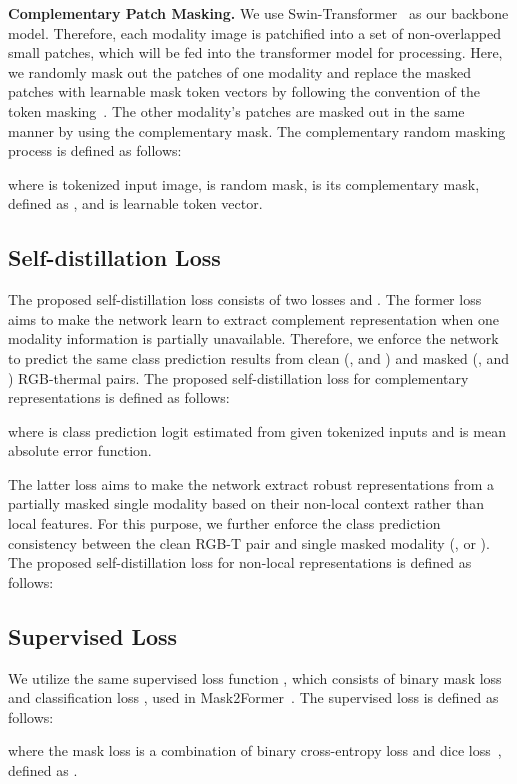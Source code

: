 \documentclass[10pt,twocolumn,letterpaper]{article}
\begin{document}
\textbf{Complementary Patch Masking.} We use Swin-Transformer~\cite{liu2021swin} as our backbone model.
Therefore, each modality image is patchified into a set of non-overlapped small patches, which will be fed into the transformer model for processing.
Here, we randomly mask out the patches of one modality and replace the masked patches with learnable mask token vectors by following the convention of the token masking~\cite{devlin2018bert,bao2021beit,xie2022simmim}.
The other modality's patches are masked out in the same manner by using the complementary mask.
The complementary random masking process is defined as follows:

where  is tokenized input image,  is random mask,  is its complementary mask, defined as , and  is learnable token vector.

\subsection{Self-distillation Loss}
The proposed self-distillation loss consists of two losses  and .
The former loss  aims to make the network learn to extract complement representation when one modality information is partially unavailable.
Therefore, we enforce the network to predict the same class prediction results from clean (\ie,  and ) and masked (\ie,  and ) RGB-thermal pairs. 
The proposed self-distillation loss for complementary representations is defined as follows:

where  is class prediction logit estimated from given tokenized inputs and  is mean absolute error function.

The latter loss  aims to make the network extract robust representations from a partially masked single modality based on their non-local context rather than local features. 
For this purpose, we further enforce the class prediction consistency between the clean RGB-T pair and single masked modality (\ie,  or ).
The proposed self-distillation loss for non-local representations is defined as follows:


\subsection{Supervised Loss}
We utilize the same supervised loss function , which consists of binary mask loss  and classification loss , used in Mask2Former~\cite{cheng2022masked}. 
The supervised loss is defined as follows:

where the mask loss  is a combination of binary cross-entropy loss and dice loss~\cite{milletari2016v}, defined as . 
\end{document}
